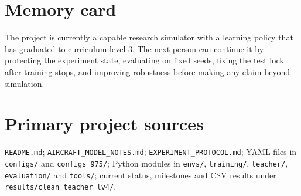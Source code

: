 \documentclass[11pt,a4paper]{article}
\begin{document}
\section{Memory card}
\begin{center}\end{center}

The project is currently a capable research simulator with a learning policy that has graduated to curriculum level 3. The next person can continue it by protecting the experiment state, evaluating on fixed seeds, fixing the test lock after training stops, and improving robustness before making any claim beyond simulation.
\section*{Primary project sources}
\texttt{README.md}; \texttt{AIRCRAFT\_MODEL\_NOTES.md}; \texttt{EXPERIMENT\_PROTOCOL.md}; YAML files in \texttt{configs/} and \texttt{configs\_975/}; Python modules in \texttt{envs/}, \texttt{training/}, \texttt{teacher/}, \texttt{evaluation/} and \texttt{tools/}; current status, milestones and CSV results under \texttt{results/clean\_teacher\_lv4/}.
\end{document}
